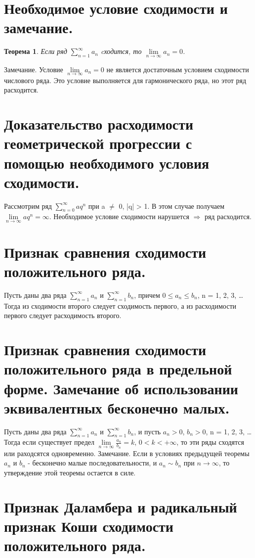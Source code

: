 \documentclass[12pt, a4paper]{article}
\newtheorem{thm}{Теорема}
\begin{document}
\section{Необходимое условие сходимости и замечание.}
\begin{thm}
	Если ряд $\sum\limits_{n=1}^{\infty}a_{n}$ cходится, то $\lim\limits_{n \to \infty}a_{n} = 0$.
\end{thm}
Замечание. Условие $\lim\limits_{n \to \infty}a_n = 0$ не является достаточным условием сходимости числового ряда. Это условие выполняется для гармонического ряда, но этот ряд расходится.


\section{Доказательство расходимости геометрической прогрессии с помощью необходимого условия сходимости.}
Рассмотрим ряд $\sum\limits_{n=0}^{\infty}aq^n$ при a $\neq$ 0, |q| > 1. В этом случае получаем $\lim\limits_{n \to \infty}aq^n = \infty$. Необходимое условие сходимости нарушется $\Longrightarrow$ ряд расходится.

\section{Признак сравнения сходимости положительного ряда.}
Пусть даны два ряда $\sum\limits_{n=1}^{\infty}a_n$ и $\sum\limits_{n=1}^{\infty}b_n$, причем $0 	\leq a_{n} \leq b_{n}$, n = 1, 2, 3, \ldots Тогда из сходимости второго следует сходимость первого, а из расходимости первого следует расходимость второго.

\section{Признак сравнения сходимости положительного ряда в предельной форме. Замечание об использовании
эквивалентных бесконечно малых.}
Пусть даны два ряда $\sum\limits_{n=1}^{\infty}a_{n}$ и $\sum\limits_{n=1}^{\infty}b_n$, и пусть $a_{n} > 0$, $b_{n} > 0$, n = 1, 2, 3, \ldots Тогда если существует предел $\lim\limits_{n \to \infty} \frac{a_{n}}{b_{n}} = k$, $0 < k < +\infty$, то эти ряды сходятся или раходсятся одновременно.
\newline
Замечание. Если в условиях предыдущей теоремы $a_n$ и $b_n$ - бесконечно малые последовательности, и $a_n \sim b_n$ при $n \to \infty$, то утверждение этой теоремы остается в силе.


\section{Признак Даламбера и радикальный признак Коши сходимости положительного ряда.}
\end{document}

